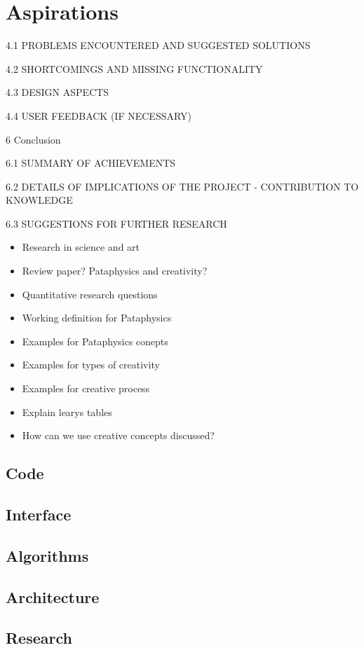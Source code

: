 
\chapter{Aspirations}
\label{ch:future}

4.1	PROBLEMS ENCOUNTERED AND SUGGESTED SOLUTIONS

4.2	SHORTCOMINGS AND MISSING FUNCTIONALITY

4.3	DESIGN ASPECTS

4.4	USER FEEDBACK (IF NECESSARY)


6	Conclusion

6.1	SUMMARY OF ACHIEVEMENTS

6.2	DETAILS OF IMPLICATIONS OF THE PROJECT - CONTRIBUTION TO KNOWLEDGE

6.3	SUGGESTIONS FOR FURTHER RESEARCH

\begin{itemize}
  \item Research in science and art
  \item Review paper? Pataphysics and creativity?
  \item Quantitative research questions
  \item Working definition for Pataphysics
  \item Examples for Pataphysics conepts
  \item Examples for types of creativity
  \item Examples for creative process
  \item Explain learys tables
  \item How can we use creative concepts discussed?
\end{itemize}


\section{Code}

\section{Interface}

\section{Algorithms}

\section{Architecture}

\section{Research}
